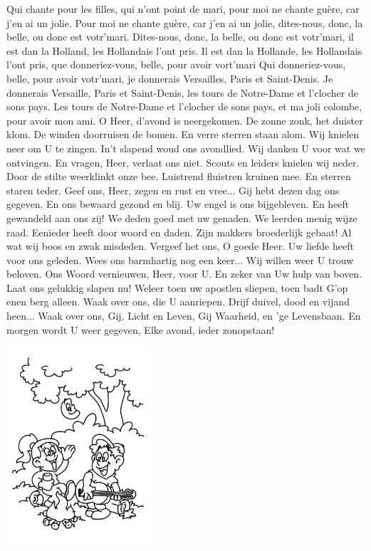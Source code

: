 \documentclass{article}
\begin{document}
\begin{songs}{}
\endverse
\beginverse
Qui chante pour les filles, qui n’ont point de mari, pour moi ne chante guère, car j’en ai un jolie.
\endverse
\beginverse
Pour moi ne chante guère, car j’en ai un jolie, dites-nous, donc, la belle, ou donc est votr’mari.
\endverse
\beginverse
Dites-nous, donc, la belle, ou donc est votr’mari, il est dan la Holland, les Hollandais l’ont pris.
\endverse
\beginverse
Il est dan la Hollande, les Hollandais l’ont pris, que donneriez-vous, belle, pour avoir vort’mari
\endverse
\beginverse
Qui donneriez-vous, belle, pour avoir votr’mari, je donnerais Versailles, Paris et Saint-Denis.
\endverse
\beginverse
Je donnerais Versaille, Paris et Saint-Denis, les tours de Notre-Dame et l’clocher de sons pays.
\endverse
\beginverse
Les tours de Notre-Dame et l’clocher de sons pays, et ma joli colombe, pour avoir mon ami.
\endverse
\endsong
{}
\beginverse
O Heer, d'avond is neergekomen. De zonne zonk, het duister klom. De winden doorruisen de bomen. En verre sterren staan alom. Wij knielen neer om U te zingen. In't slapend woud ons avondlied. Wij danken U voor wat we ontvingen. En vragen, Heer, verlaat ons niet.
\endverse
\beginchorus
Scouts en leiders knielen wij neder. Door de stilte weerklinkt onze bee. Luistrend fluistren kruinen mee. En sterren staren teder. Geef ons, Heer, zegen en rust en vree...
\endchorus
\beginverse
Gij hebt dezen dag ons gegeven. En ons bewaard gezond en blij. Uw engel is ons bijgebleven. En heeft gewandeld aan ons zij! We deden goed met uw genaden. We leerden menig wijze raad. Eenieder heeft door woord en daden. Zijn makkers broederlijk gebaat!
\endverse
\beginverse
Al wat wij boos en zwak misdeden. Vergeef het ons, O goede Heer. Uw liefde heeft voor ons geleden. Wees ons barmhartig nog een keer... Wij willen weer U trouw beloven. Ons Woord vernieuwen, Heer, voor U. En zeker van Uw hulp van boven. Laat ons gelukkig slapen nu!
\endverse
\beginverse
Weleer toen uw apostlen sliepen, toen badt G'op enen berg alleen. Waak over ons, die U aanriepen. Drijf duivel, dood en vijand heen... Waak over ons, Gij, Licht en Leven, Gij Waarheid, en 'ge Levensbaan. En morgen wordt U weer gegeven, Elke avond, ieder zonopstaan!
\endverse
\endsong
\begin{intersong}
    \includegraphics[width=0.4\textwidth]{img6}

\end{intersong}
\end{songs}
\end{document}
